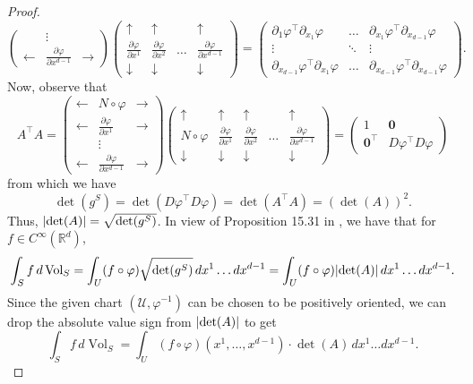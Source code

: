 \documentclass{article}
\renewcommand\det{\operatorname{det}}
\newcommand{\p}{\partial}
\newcommand{\R}{\mathbb{R}}
\newcommand{\f}[2]{\frac{#1}{#2}}
\theoremstyle{theorem}
\newcommand{\Vol}{\operatorname{Vol}}
\begin{document}
\begin{proof}
\begin{equation*}
\begin{pmatrix}
     &\vdots& \\
     \leftarrow & \f{\p \varphi}{\p x^{d-1}} & \rightarrow 
    \end{pmatrix} \begin{pmatrix}
    \uparrow & \uparrow &   &\uparrow \\ 
    \f{\p \varphi}{\p x^1}& \f{\p \varphi}{\p x^2}  &\dots&\f{\p \varphi}{\p x^{d-1}}\\
    \downarrow  & \downarrow &    &\downarrow 
    \end{pmatrix} = \begin{pmatrix} 
    \p_1 \varphi^\top \p_{x_1} \varphi & \dots & \p_{x_1}  \varphi^\top \p_{x_{d-1}}\varphi \\
    \vdots & \ddots & \vdots \\
    \p_{x_{d-1}} \varphi^\top \p_{x_1} \varphi & \dots & \p_{x_{d-1}} \varphi^\top \p_{x_{d-1}}\varphi 
    \end{pmatrix}.
\end{equation*}
Now, observe that
\begin{equation*}
    A^\top A = \begin{pmatrix}
    \leftarrow& N \circ \varphi & \rightarrow\\
    \leftarrow & \f{\p \varphi}{\p x^1} &\rightarrow \\
    &\vdots& \\
    \leftarrow & \f{\p \varphi}{\p x^{d-1}} & \rightarrow
    \end{pmatrix}
    \begin{pmatrix}
    \uparrow &\uparrow & \uparrow &   &\uparrow \\ 
    N \circ \varphi &\f{\p \varphi}{\p x^1}& \f{\p \varphi}{\p x^2}  &\dots&\f{\p \varphi}{\p x^{d-1}}\\
    \downarrow  &\downarrow  & \downarrow &    &\downarrow
    \end{pmatrix} = 
    \begin{pmatrix}
    1 & \mathbf{0} \\ \mathbf{0}^\top & D\varphi^\top D\varphi
    \end{pmatrix}
\end{equation*}
from which we have
\begin{equation*}
    \det(g^S) = \det(D\varphi^\top D\varphi) = \det(A^\top A) = (\det(A))^2.
\end{equation*}
Thus, $\abs{\det(A)} = \sqrt{\det(g^S)}$. In view of Proposition 15.31 in \cite{lee2013smooth}, we have that for $f\in C^\infty(\R^d)$,
\begin{equation*}
    \int_S f\,d \Vol_S = \int_{U} (f\circ \varphi) \sqrt{\det(g^S)} \,dx^1\dots dx^{d-1} = \int_{U} (f\circ \varphi) \abs{\det(A)} \,dx^1\dots dx^{d-1}.
\end{equation*}
Since the given chart $(\mathcal{U}, \varphi^{-1})$ can be chosen to be positively oriented, we can drop the absolute value sign from $\abs{\det(A)}$ to get 
\begin{equation*}
    \int_S f\,d \Vol_S  = \int_{U} (f\circ \varphi)(x^1,\dots,x^{d-1}) \cdot {\det(A)} \,dx^1\dots dx^{d-1}.
\end{equation*}
\end{proof}
\end{document}

